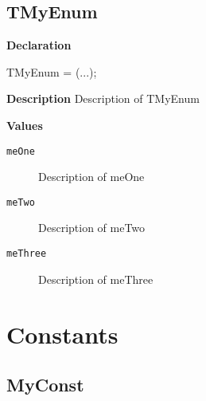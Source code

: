 \documentclass{report}
\newif\ifpdf
\begin{document}
\subsection*{TMyEnum}
\fi
\label{ok_back_comment-TMyEnum}
\begin{list}{}{
\setlength{\itemindent}{0cm}
\setlength{\listparindent}{0cm}
\setlength{\leftmargin}{\evensidemargin}
\addtolength{\leftmargin}{\tmplength}
\settowidth{\labelsep}{X}
\addtolength{\leftmargin}{\labelsep}
\setlength{\labelwidth}{\tmplength}
}
\item[\textbf{Declaration}\hfill]
\ifpdf
\begin{flushleft}
\fi
\begin{ttfamily}
TMyEnum = (...);\end{ttfamily}

\ifpdf
\end{flushleft}
\fi

\par
\item[\textbf{Description}]
Description of TMyEnum\item[\textbf{Values}]
\begin{description}
\item[\texttt{meOne}] \label{ok_back_comment-meOne}
\index{}
Description of meOne
\item[\texttt{meTwo}] \label{ok_back_comment-meTwo}
\index{}
Description of meTwo
\item[\texttt{meThree}] \label{ok_back_comment-meThree}
\index{}
Description of meThree
\end{description}


\end{list}
\section{Constants}
\ifpdf
\subsection*{\large{\textbf{MyConst}}\normalsize\hspace{1ex}\hrulefill}
\else
\end{document}
